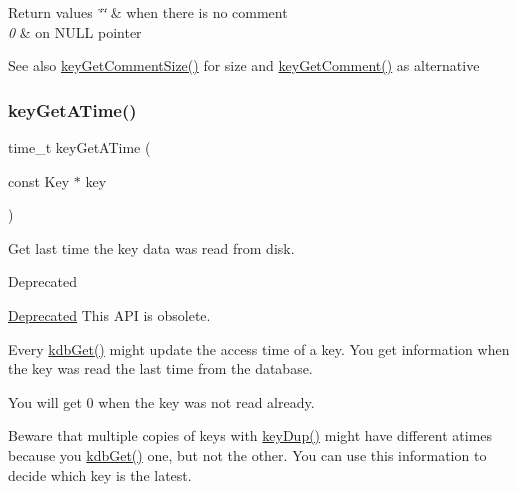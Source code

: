 \begin{DoxyRetVals}{Return values}
{\em \char`\"{}\char`\"{}} & when there is no comment \\
\hline
{\em 0} & on N\+U\+LL pointer \\
\hline
\end{DoxyRetVals}
\begin{DoxySeeAlso}{See also}
\hyperlink{group__meta_ga0dd737fadc16d4cf16720d17f066a9d3}{key\+Get\+Comment\+Size()} for size and \hyperlink{group__meta_gafb89735689929ff717cc9f2d0d0b46a2}{key\+Get\+Comment()} as alternative 
\end{DoxySeeAlso}
\mbox{\label{group__meta_ga6b05da399c3c78904969ef39f191b0eb}} 
\subsubsection{\texorpdfstring{key\+Get\+A\+Time()}{keyGetATime()}}
{\footnotesize\ttfamily time\+\_\+t key\+Get\+A\+Time (\begin{DoxyParamCaption}\item[{const Key $\ast$}]{key }\end{DoxyParamCaption})}



Get last time the key data was read from disk. 

\begin{DoxyRefDesc}{Deprecated}
\item[\hyperlink{deprecated__deprecated000020}{Deprecated}]This A\+PI is obsolete.\end{DoxyRefDesc}


Every \hyperlink{group__kdb_ga28e385fd9cb7ccfe0b2f1ed2f62453a1}{kdb\+Get()} might update the access time of a key. You get information when the key was read the last time from the database.

You will get 0 when the key was not read already.

Beware that multiple copies of keys with \hyperlink{group__key_gae6ec6a60cc4b8c1463fa08623d056ce3}{key\+Dup()} might have different atimes because you \hyperlink{group__kdb_ga28e385fd9cb7ccfe0b2f1ed2f62453a1}{kdb\+Get()} one, but not the other. You can use this information to decide which key is the latest.


